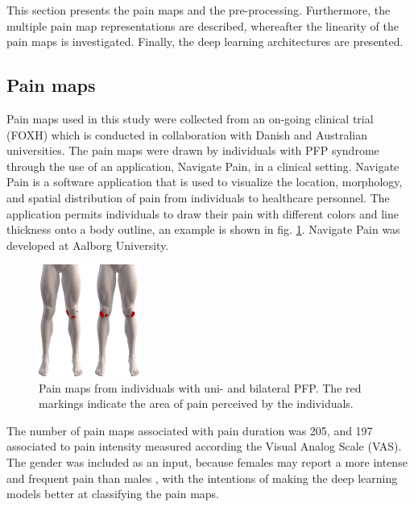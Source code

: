 This section presents the pain maps and the pre-processing. Furthermore, the multiple pain map representations are described, whereafter the linearity  of the pain maps is investigated. Finally, the deep learning architectures are presented.

\subsection{Pain maps}
Pain maps used in this study were collected from an on-going clinical trial (FOXH) which is conducted in collaboration with Danish and Australian universities. The pain maps were drawn by individuals with PFP syndrome through the use of an application, Navigate Pain, in a clinical setting. \newline
\noindent
Navigate Pain is a software application that is used to visualize the location, morphology, and spatial distribution of pain from individuals to healthcare personnel. The application permits individuals to draw their pain with different colors and line thickness onto a body outline, an example is shown in fig. \ref{fig:twoPainmaps}. Navigate Pain was developed at Aalborg University.\citep{Solutions2015}

\begin{figure}[H]
\centering
\includegraphics[width=0.3\textwidth]{Figures/twoPainmaps}
\caption{Pain maps from individuals with uni- and bilateral PFP. The red markings indicate the area of pain perceived by the individuals.}
\label{fig:twoPainmaps}
\end{figure}

\noindent
The number of pain maps associated with pain duration was 205, and 197 associated to pain intensity measured according the Visual Analog Scale (VAS). The gender was included as an input, because females may report a more intense and frequent pain than males \citep{Pieh2012}, with the intentions of making the deep learning models better at classifying the pain maps.

